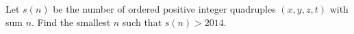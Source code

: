 Let $s(n)$ be the number of ordered positive integer quadruples $(x,y,z,t)$ with sum $n$. Find the smallest $n$ such that $s(n)>2014$.
